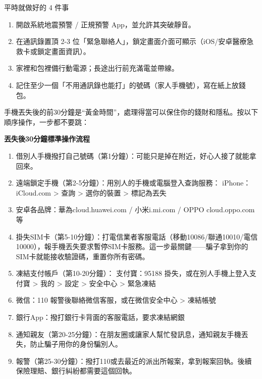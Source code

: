 \begin{tcbpractice}{平時就做好的 4 件事}
\begin{enumerate}
  \item 開啟系統地震預警 / 正規預警 App，並允許其突破靜音。
  \item 在通訊錄置頂 2-3 位「緊急聯絡人」，鎖定畫面介面可顯示（iOS/安卓醫療急救卡或鎖定畫面資訊）。
  \item 家裡和包裡備行動電源；長途出行前充滿電並帶線。
  \item 記住至少一個「不用通訊錄也能打」的號碼（家人手機號），寫在紙上放錢包。
\end{enumerate}

\end{tcbpractice}


手機丟失後的前30分鐘是“黃金時間”，處理得當可以保住你的錢財和隱私。按以下順序操作，一步都不要跳：

\textbf{丟失後30分鐘標準操作流程}\par

\begin{enumerate}
  \item 借別人手機撥打自己號碼（第1分鐘）：可能只是掉在附近，好心人接了就能拿回來。
  \item 遠端鎖定手機（第2-5分鐘）：用別人的手機或電腦登入查詢服務： iPhone：iCloud.com > 查詢 > 選你的裝置 > 標記為丟失
  \item 安卓各品牌：華為cloud.huawei.com / 小米i.mi.com / OPPO cloud.oppo.com 等
  \item 掛失SIM卡（第5-10分鐘）：打電信業者客服電話（移動10086/聯通10010/電信10000），報手機丟失要求暫停SIM卡服務。這一步最關鍵——騙子拿到你的SIM卡就能接收驗證碼，重置你所有密碼。
  \item 凍結支付帳戶（第10-20分鐘）： 支付寶：95188 掛失，或在別人手機上登入支付寶 > 我的 > 設定 > 安全中心 > 緊急凍結
  \item 微信：110 報警後聯絡微信客服，或在微信安全中心 > 凍結帳號
  \item 銀行App：撥打銀行卡背面的客服電話，要求凍結網銀
  \item 通知親友（第20-25分鐘）：在朋友圈或讓家人幫忙發訊息，通知親友手機丟失，防止騙子用你的身份騙別人。
  \item 報警（第25-30分鐘）：撥打110或去最近的派出所報案，拿到報案回執。後續保險理賠、銀行糾紛都需要這個回執。
\end{enumerate}


